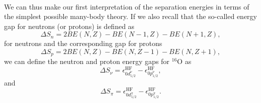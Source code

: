 \documentclass[%
twoside,                 %
final,                   %
10pt]{article}
\begin{document}
\paragraph{}
We can thus make our first interpretation of the separation energies in terms of the simplest
possible many-body theory. 
If we also recall that the so-called energy gap for neutrons (or protons) is defined as
\[
\Delta S_n= 2BE(N,Z)-BE(N-1,Z)-BE(N+1,Z),
\]
for neutrons and the corresponding gap for protons
\[
\Delta S_p= 2BE(N,Z)-BE(N,Z-1)-BE(N,Z+1),
\]
we can define the neutron and proton energy gaps for $^{16}$O as
\[
\Delta S_{\nu}=\epsilon_{0d^{\nu}_{5/2}}^{\mathrm{HF}}-\epsilon_{0p^{\nu}_{1/2}}^{\mathrm{HF}}, 
\]
and 
\[
\Delta S_{\pi}=\epsilon_{0d^{\pi}_{5/2}}^{\mathrm{HF}}-\epsilon_{0p^{\pi}_{1/2}}^{\mathrm{HF}}. 
\]











\printindex
\end{document}
